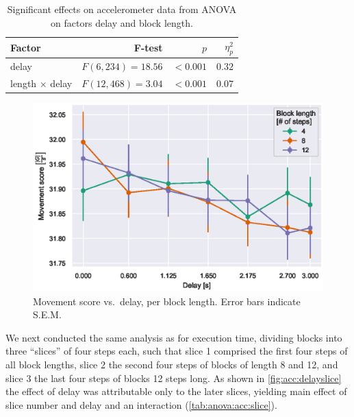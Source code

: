 \begin{table}[h]
  \centering
  \caption{Significant effects on accelerometer data from ANOVA on factors delay and block length.}\label{tab:anova:acc}
  \setlength{\tabcolsep}{0pt} %
  \begin{tabular*}{\columnwidth}{@{\extracolsep{\fill}\quad}lrrr@{}}
    \toprule
    \textbf{Factor} & \textbf{F-test} & \textbf{\(p\)} & \textbf{\(\eta^{2}_{p}\)} \\ 
    \midrule
    delay & \(F(6, 234) = 18.56\) & \(<0.001\) & \(0.32\) \\
    length \( \times \) delay & \(F(12, 468) = 3.04\) & \(<0.001\) & \(0.07\) \\ 
    \bottomrule
  \end{tabular*}%
\end{table}

\begin{figure}[h]
    \centering
    \includegraphics[width=.8\textwidth]{publications/2021ImpactDelayedResponse/Fig9.eps}
    \caption{Movement score vs.\ delay, per block length. Error bars indicate S.E.M.}\label{fig:acc:delaylength}
\end{figure}

We next conducted the same analysis as for execution time, dividing blocks into three ``slices'' of four steps each, such that slice 1 comprised the first four steps of all block lengths, slice 2 the second four steps of blocks of length 8 and 12, and slice 3 the last four steps of blocks 12 steps long.
As shown in \cref{fig:acc:delayslice} the effect of delay was attributable only to the later slices, yielding main effect of slice number and delay and an interaction (\cref{tab:anova:acc:slice}). 

